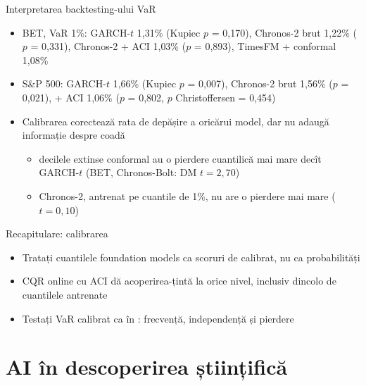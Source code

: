 \begin{frame}{Interpretarea backtesting-ului VaR}
\itemsize{\small}
\begin{itemize}
    \item BET, VaR 1\%: GARCH-$t$ 1{,}31\% (Kupiec $p$ = 0{,}170), Chronos-2 brut 1{,}22\% ($p$ = 0{,}331), Chronos-2 + ACI 1{,}03\% ($p$ = 0{,}893), TimesFM + conformal 1{,}08\%
    \item S\&P 500: GARCH-$t$ 1{,}66\% (Kupiec $p$ = 0{,}007), Chronos-2 brut 1{,}56\% ($p$ = 0{,}021), + ACI 1{,}06\% ($p$ = 0{,}802, $p$ Christoffersen = 0{,}454)
    \item Calibrarea corectează rata de depășire a oricărui model, dar nu adaugă informație despre coadă
    \begin{itemize}
        \item decilele extinse conformal au o pierdere cuantilică mai mare decît GARCH-$t$ (BET, Chronos-Bolt: DM $t = 2{,}70$)
        \item Chronos-2, antrenat pe cuantile de 1\%, nu are o pierdere mai mare ($t = 0{,}10$)
    \end{itemize}
\end{itemize}
\end{frame}

\begin{frame}{Recapitulare: calibrarea}
\itemsize{\small}
\begin{itemize}
    \item Tratați cuantilele foundation models ca scoruri de calibrat, nu ca probabilități
    \item CQR online cu ACI dă acoperirea-țintă la orice nivel, inclusiv dincolo de cuantilele antrenate
    \item Testați VaR calibrat ca în : frecvență, independență și pierdere
\end{itemize}
\end{frame}


\section{AI în descoperirea științifică}

